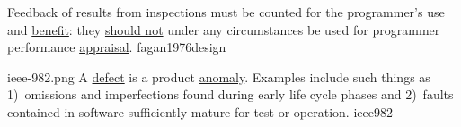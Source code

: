 \documentclass{article}
\begin{document}

  {Feedback of results from inspections must be counted for the programmer's use and \ul{benefit}: they \ul{should not} under any circumstances be used for programmer performance \ul{appraisal}.}
  {fagan1976design}



\qte
  {ieee-982.png}
  {A \ul{defect} is a product \ul{anomaly}. Examples include such things as 1)~omissions and imperfections found during early life cycle phases and 2)~faults contained in software sufficiently mature for test or operation.}
  {ieee982}
\end{document}
